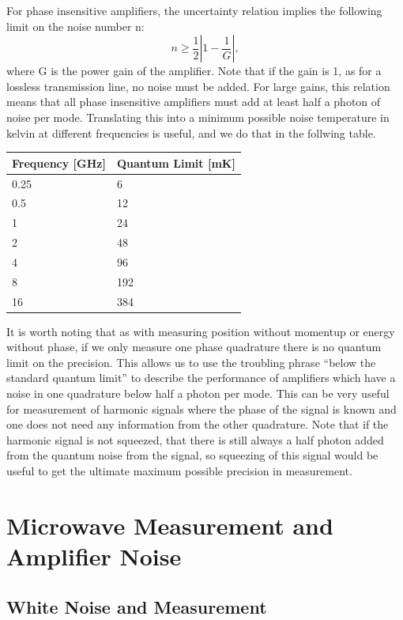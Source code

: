 \documentclass{report}
\begin{document}
	For phase insensitive amplifiers, the uncertainty relation implies the following limit on the noise number n:
\begin{equation}
n\geq \frac{1}{2}\left|1 - \frac{1}{G}\right|, 
\end{equation}
where G is the power gain of the amplifier.  Note that if the gain is 1, as for a lossless transmission line, no noise must be added.  For large gains, this relation means that all phase insensitive amplifiers must add at least half a photon of noise per mode.  Translating this into a minimum possible noise temperature in kelvin at different frequencies is useful, and we do that in the follwing table.  
\begin{center}
    \begin{tabular}{ | l | l  |}
    \hline
    Frequency [GHz] & Quantum Limit [mK] \\ \hline
    0.25 & 6  \\ \hline
    0.5 & 12  \\ \hline
    1 & 24 \\ \hline
    2 & 48 \\ \hline
    4 & 96\\ \hline
    8 & 192 \\ \hline
    16 & 384\\ \hline
    \end{tabular}
\end{center}

It is worth noting that as with measuring position without momentup or energy without phase, if we only measure one phase quadrature there is no quantum limit on the precision.  This allows us to use the troubling phrase ``below the standard quantum limit'' to describe the performance of amplifiers which have a noise in one quadrature below half a photon per mode.  This can be very useful for measurement of harmonic signals where the phase of the signal is known and one does not need any information from the other quadrature.  Note that if the harmonic signal is not squeezed, that there is still always a half photon added from the quantum noise from the signal, so squeezing of this signal would be useful to get the ultimate maximum possible precision in measurement.  

\section{Microwave Measurement and Amplifier Noise}
	\subsection{White Noise and Measurement}
		
\end{document}

